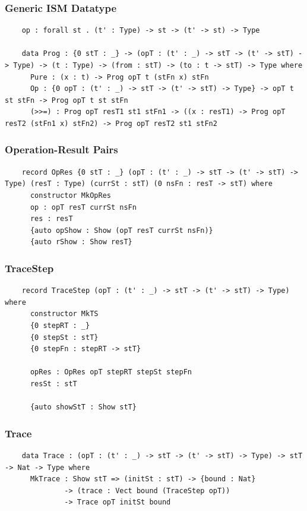 \documentclass[compress]{beamer}
\begin{document}
\begin{frame}[fragile]
  \frametitle{Generic ISM Datatype}

  \begin{verbatim}
    op : forall st . (t' : Type) -> st -> (t' -> st) -> Type

    data Prog : {0 stT : _} -> (opT : (t' : _) -> stT -> (t' -> stT) -> Type) -> (t : Type) -> (from : stT) -> (to : t -> stT) -> Type where
      Pure : (x : t) -> Prog opT t (stFn x) stFn
      Op : {0 opT : (t' : _) -> stT -> (t' -> stT) -> Type} -> opT t st stFn -> Prog opT t st stFn
      (>>=) : Prog opT resT1 st1 stFn1 -> ((x : resT1) -> Prog opT resT2 (stFn1 x) stFn2) -> Prog opT resT2 st1 stFn2
  \end{verbatim}

\end{frame}


\begin{frame}[fragile]
  \frametitle{Operation-Result Pairs}

  \begin{verbatim}
    record OpRes {0 stT : _} (opT : (t' : _) -> stT -> (t' -> stT) -> Type) (resT : Type) (currSt : stT) (0 nsFn : resT -> stT) where
      constructor MkOpRes
      op : opT resT currSt nsFn
      res : resT
      {auto opShow : Show (opT resT currSt nsFn)}
      {auto rShow : Show resT}
  \end{verbatim}

\end{frame}


\begin{frame}[fragile]
  \frametitle{TraceStep}

  \begin{verbatim}
    record TraceStep (opT : (t' : _) -> stT -> (t' -> stT) -> Type) where
      constructor MkTS
      {0 stepRT : _}
      {0 stepSt : stT}
      {0 stepFn : stepRT -> stT}

      opRes : OpRes opT stepRT stepSt stepFn
      resSt : stT

      {auto showStT : Show stT}
  \end{verbatim}

\end{frame}


\begin{frame}[fragile]
  \frametitle{Trace}

  \begin{verbatim}
    data Trace : (opT : (t' : _) -> stT -> (t' -> stT) -> Type) -> stT -> Nat -> Type where
      MkTrace : Show stT => (initSt : stT) -> {bound : Nat}
              -> (trace : Vect bound (TraceStep opT))
              -> Trace opT initSt bound
  \end{verbatim}

\end{frame}
\end{document}
